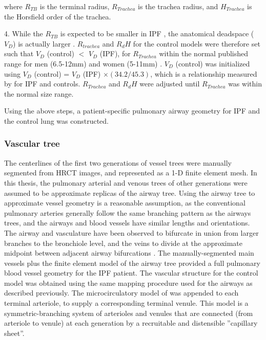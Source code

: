 \noindent where $R_{TB}$ is the terminal radius, $R_{Trachea}$ is the trachea radius, and $H_{Trachea}$ is the Horsfield order of the trachea.

4. While the $R_{TB}$ is expected to be smaller in IPF \citep{crystal1976idiopathic}, the anatomical deadspace ($V_D$) is actually larger \citep{plantier2016increased}. $R_{trachea}$ and $R_dH$ for the control models were therefore set such that $V_D$ (control) $<$ $V_D$ (IPF), for $R_{Trachea}$ within the normal published range for men (6.5-12mm) and women (5-11mm) \citep{breatnach1984dimensions}. $V_D$ (control) was initialized using $V_D$ (control) = $V_D$ (IPF) $\times (34.2/45.3)$, which is a relationship measured by \cite{plantier2016increased} for IPF and controls. $R_{Trachea}$ and $R_dH$ were adjusted until $R_{Trachea}$ was within the normal size range.

Using the above steps, a patient-specific pulmonary airway geometry for IPF and the control lung was constructed. 

\subsubsection{Vascular tree}
The centerlines of the first two generations of vessel trees were manually segmented from HRCT images, and represented as a 1-D finite element mesh. In this thesis, the pulmonary arterial and venous trees of other generations were assumed to be approximate replicas of the airway tree. Using the airway tree to approximate vessel geometry is a reasonable assumption, as the conventional pulmonary arteries generally follow the same branching pattern as the airways trees, and the airways and blood vessels have similar lengths and orientations. The airway and vasculature have been observed to bifurcate in union from larger branches to the bronchiole level, and the veins to divide at the approximate midpoint between adjacent airway bifurcations \citep{weibel1984pathway, hsia2016lung}. The manually-segmented main vessels plus the finite element model of the airway tree provided a full pulmonary blood vessel geometry for the IPF patient. The vascular structure for the control model was obtained using the same mapping procedure used for the airways as described previously. The microcirculatory model of \cite{clark2010contribution,clark2011interdependent} was appended to each terminal arteriole, to supply a corresponding terminal venule. This model is a symmetric-branching system of arterioles and venules that are connected (from arteriole to venule) at each generation by a recruitable and distensible ''capillary sheet''.

